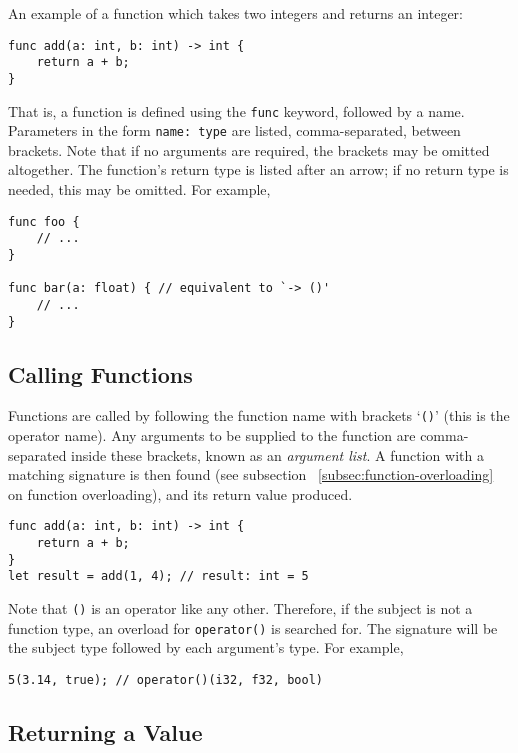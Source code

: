 \documentclass{article}
\begin{document}
    An example of a function which takes two integers and returns an integer:
    \begin{lstlisting}[language=CustomLang]
func add(a: int, b: int) -> int {
    return a + b;
}
    \end{lstlisting}

    That is, a function is defined using the \texttt{func} keyword, followed by a name.
    Parameters in the form \texttt{name: type} are listed, comma-separated, between brackets.
    Note that if no arguments are required, the brackets may be omitted altogether.
    The function's return type is listed after an arrow; if no return type is needed, this may be omitted.
    For example,
    \begin{lstlisting}[language=CustomLang]
func foo {
    // ...
}

func bar(a: float) { // equivalent to `-> ()'
    // ...
}
    \end{lstlisting}

    \subsection{Calling Functions}

    Functions are called by following the function name with brackets `\texttt{()}' (this is the operator name).
    Any arguments to be supplied to the function are comma-separated inside these brackets, known as an \textit{argument list}.
    A function with a matching signature is then found (see subsection ~\ref{subsec:function-overloading} on function overloading), and its return value produced.

    \begin{lstlisting}[language=CustomLang]
func add(a: int, b: int) -> int {
    return a + b;
}
let result = add(1, 4); // result: int = 5
    \end{lstlisting}

    Note that \texttt{()} is an operator like any other.
    Therefore, if the subject is not a function type, an overload for \texttt{operator()} is searched for.
    The signature will be the subject type followed by each argument's type.
    For example,

    \begin{lstlisting}[language=CustomLang]
5(3.14, true); // operator()(i32, f32, bool)
    \end{lstlisting}

    \subsection{Returning a Value}
\end{document}
